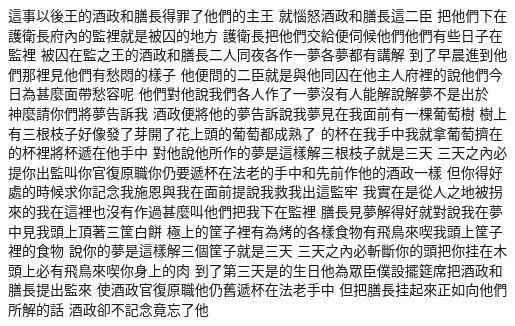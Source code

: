 \bchapter%
這事以後\chientien{}王的酒政和膳長\chientien 得罪了他們的主王\chientien 
{}就惱怒酒政和膳長這二臣\yuentien 
{}把他們下在護衛長府內的監裡\chientien 就是被囚的地方\chuan 
{}護衛長把他們交給\chientien{}便伺候他們\yuentien 他們有些日子在監裡\chuan 
{}被囚在監之王的酒政和膳長\chientien 二人同夜各作一夢\chientien 各夢都有講解\chuan 
{}到了早晨\chientien{}進到他們那裡\chientien 見他們有愁悶的樣子\chuan 
{}他便問的二臣\chientien 就是與他同囚在他主人府裡的\chientien 說\chientien 他們今日為甚麼面帶愁容呢\chuan 
{}他們對他說\chientien 我們各人作了一夢\chientien 沒有人能解\yuentien{}說\chientien 解夢不是出於　神麼\chientien 請你們將夢告訴我\chuan\Chuan
{}酒政便將他的夢告訴說\chientien 我夢見在我面前有一棵葡萄樹\chientien 
{}樹上有三根枝子\chientien 好像發了芽\chientien 開了花\chientien 上頭的葡萄都成熟了\chuan 
{}的杯在我手中\chientien 我就拿葡萄擠在的杯裡\chientien 將杯遞在他手中\chuan 
{}對他說\chientien 他所作的夢是這樣解\chientien 三根枝子就是三天\yuentien 
{}三天之內\chientien{}必提你出監\chientien 叫你官復原職\chientien 你仍要遞杯在法老的手中\chientien 和先前作他的酒政一樣\chuan 
{}但你得好處的時候\chientien 求你記念我\chientien 施恩與我\chientien 在面前提說我\chientien 救我出這監牢\chuan 
{}我實在是從人之地被拐來的\chientien 我在這裡也沒有作過甚麼\chientien 叫他們把我下在監裡\chuan\Chuan
{}膳長見夢解得好\chientien 就對說\chientien 我在夢中見我頭上頂著三筐白餅\yuentien 
{}極上的筐子裡\chientien 有為烤的各樣食物\chientien 有飛鳥來喫我頭上筐子裡的食物\chuan 
{}說\chientien 你的夢是這樣解\chientien 三個筐子就是三天\yuentien 
{}三天之內\chientien{}必斬斷你的頭\chientien 把你挂在木頭上\chientien 必有飛鳥來喫你身上的肉\chuan 
{}到了第三天\chientien 是的生日\chientien 他為眾臣僕設擺筵席\chientien 把酒政和膳長提出監來\yuentien 
{}使酒政官復原職\chientien 他仍舊遞杯在法老手中\chuan 
{}但把膳長挂起來\chientien 正如向他們所解的話\chuan 
{}酒政卻不記念\chientien 竟忘了他\chuan 
